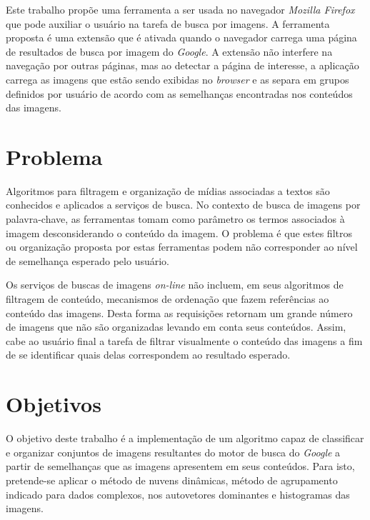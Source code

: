 Este trabalho propõe uma ferramenta a ser usada  no navegador \emph{Mozilla Firefox} que pode auxiliar o usuário na tarefa de busca por imagens. A ferramenta proposta é uma extensão que é ativada quando o navegador carrega uma página de resultados de busca por imagem do \emph{Google}. A extensão não interfere na navegação por outras páginas, mas ao detectar a página de interesse, a aplicação carrega as imagens que estão sendo exibidas no \emph{browser} e as separa em grupos definidos por usuário de acordo com as semelhanças encontradas nos conteúdos das imagens.

\section{Problema}
Algoritmos para filtragem e organização de mídias associadas a textos são conhecidos e aplicados a serviços de busca. No contexto de busca de imagens por palavra-chave, as ferramentas tomam como parâmetro os termos associados à imagem desconsiderando o conteúdo da imagem. O problema é que estes filtros ou organização proposta por estas ferramentas podem não corresponder ao nível de semelhança esperado pelo usuário.

Os serviços de buscas de imagens \emph{on-line} não incluem, em seus algoritmos de filtragem de conteúdo, mecanismos de ordenação que fazem referências ao conteúdo das imagens. Desta forma as requisições retornam um grande número de imagens que não são organizadas levando em conta seus conteúdos. Assim, cabe ao usuário final a tarefa de filtrar visualmente o conteúdo das imagens a fim de se identificar quais delas correspondem ao resultado esperado.

\section{Objetivos}

\begin{comment}
\textbf{objetivos está muito seco, coloque mais um parágrafo indicando os objetivos específicos}
\end{comment}

O objetivo deste trabalho é a implementação de um algoritmo capaz de
classificar e organizar conjuntos de imagens resultantes do motor de busca do \emph{Google} a partir de semelhanças que as imagens apresentem em seus conteúdos. Para isto, pretende-se aplicar o método de nuvens dinâmicas, método de agrupamento indicado para dados complexos, nos autovetores dominantes e histogramas das imagens.

